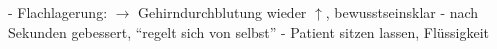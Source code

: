 
\begin{itemize}
  -   Flachlagerung: ${\rightarrow}$ Gehirndurchblutung
  wieder ${\uparrow}$, bewusstseinsklar
  -   nach Sekunden gebessert, \enquote{regelt sich von
  selbst}
  -   Patient sitzen lassen, Flüssigkeit
\end{itemize}